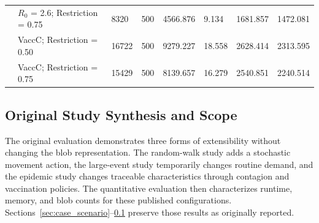 \documentclass[pdflatex,sn-mathphys-num]{sn-jnl}%
\theoremstyle{thmstyleone}%
\theoremstyle{thmstyletwo}%
\theoremstyle{thmstylethree}%
\begin{document}
\begin{table}[ht]
{\begin{tabular}{@{}clllllll@{}}
                                                                                                                       & $R_0$ = 2.6; Restriction = 0.75      & 8320                                                                         & 500                                                                            & 4566.876                                                                       & 9.134                                                                            & 1681.857                                                                                & 1472.081                                                                                 \\
                                                                                                                       & VaccC; Restriction = 0.50         & 16722                                                                        & 500                                                                            & 9279.227                                                                       & 18.558                                                                           & 2628.414                                                                                & 2313.595                                                                                 \\
                                                                                                                       & VaccC; Restriction = 0.75         & 15429                                                                        & 500                                                                            & 8139.657                                                                       & 16.279                                                                           & 2540.851                                                                                & 2240.514                                                                                 \\ \bottomrule
\end{tabular}
} %
\end{table}

\subsection{Original Study Synthesis and Scope}
\label{sec:comments}

The original evaluation demonstrates three forms of extensibility without changing the blob representation. The random-walk study adds a stochastic movement action, the large-event study temporarily changes routine demand, and the epidemic study changes traceable characteristics through contagion and vaccination policies. The quantitative evaluation then characterizes runtime, memory, and blob counts for these published configurations. Sections~\ref{sec:case_scenario}--\ref{sec:comments} preserve those results as originally reported.
\end{document}
